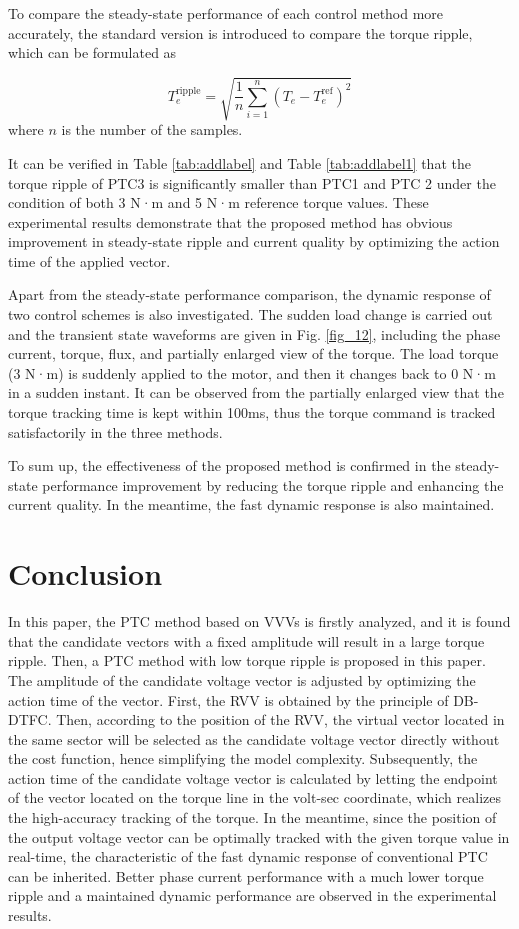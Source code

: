 \documentclass[sn-basic]{sn-jnl}
\theoremstyle{thmstyleone}%
\theoremstyle{thmstyletwo}%
\theoremstyle{thmstylethree}%
\theoremstyle{thmstyleone}%
\begin{document}
To compare the steady-state performance of each control method more accurately, the standard version is introduced to compare the torque ripple, which can be formulated as

\begin{equation}
T_{e}^{\text{ripple}} = \sqrt{\frac{1}{n}{\sum_{i = 1}^{n}\left( {T_{e} - T_{e}^{\text{ref}}} \right)^{2}}}
\end{equation}
where ${n}$ is the number of the samples.

It can be verified in Table {\ref{tab:addlabel}} and Table {\ref{tab:addlabel1} }that the torque ripple of PTC3 is significantly smaller than PTC1 and PTC 2 under the condition of both 3 N·m and 5 N·m reference torque values. These experimental results demonstrate that the proposed method has obvious improvement in steady-state ripple and current quality by optimizing the action time of the applied vector.


Apart from the steady-state performance comparison, the dynamic response of two control schemes is also investigated. The sudden load change is carried out and the transient state waveforms are given in Fig. {\ref{fig_12}}, including the phase current, torque, flux, and partially enlarged view of the torque. The load torque (3 N·m) is suddenly applied to the motor, and then it changes back to 0 N·m in a sudden instant. It can be observed from the partially enlarged view that the torque tracking time is kept within 100ms, thus the torque command is tracked satisfactorily in the three methods.

To sum up, the effectiveness of the proposed method is confirmed in the steady-state performance improvement by reducing the torque ripple and enhancing the current quality. In the meantime, the fast dynamic response is also maintained.

\section{Conclusion}\label{sec6}
In this paper, the PTC method based on VVVs is firstly analyzed, and it is found that the candidate vectors with a fixed amplitude will result in a large torque ripple. Then, a PTC method with low torque ripple is proposed in this paper. The amplitude of the candidate voltage vector is adjusted by optimizing the action time of the vector. First, the RVV is obtained by the principle of DB-DTFC. Then, according to the position of the RVV, the virtual vector located in the same sector will be selected as the candidate voltage vector directly without the cost function, hence simplifying the model complexity. Subsequently, the action time of the candidate voltage vector is calculated by letting the endpoint of the vector located on the torque line in the volt-sec coordinate, which realizes the high-accuracy tracking of the torque. In the meantime, since the position of the output voltage vector can be optimally tracked with the given torque value in real-time, the characteristic of  the fast dynamic response of conventional PTC can be inherited. Better phase current performance with a much lower torque ripple and a maintained dynamic performance are observed in the experimental results.
%
\end{document}
